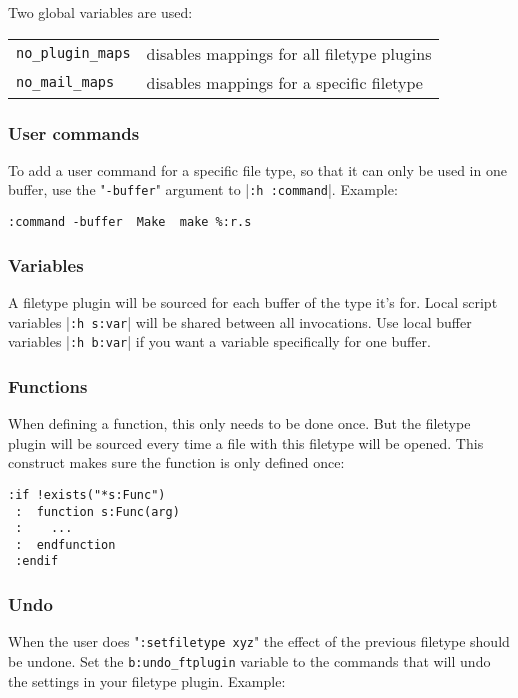 Two global variables are used:
\begin{center} \begin{tabular}{l l}
				\verb!no_plugin_maps! & disables mappings for all filetype plugins \\
				\verb!no_mail_maps! & disables mappings for a specific filetype \\
\end{tabular} \end{center}

\subsubsection{User commands}
To add a user command for a specific file type, so that it can only be used in one buffer, use the "\verb!-buffer!" argument to |\verb!:h :command!|.
Example:

\begin{Verbatim}[samepage=true]
 :command -buffer  Make  make %:r.s
\end{Verbatim}

\subsubsection{Variables}
A filetype plugin will be sourced for each buffer of the type it's for.
Local script variables |\verb!:h s:var!| will be shared between all invocations.
Use local buffer variables |\verb!:h b:var!| if you want a variable specifically for one buffer.

\subsubsection{Functions}
When defining a function, this only needs to be done once.
But the filetype plugin will be sourced every time a file with this filetype will be opened.
This construct makes sure the function is only defined once:

\begin{Verbatim}[samepage=true]
 :if !exists("*s:Func")
 :  function s:Func(arg)
 :    ...
 :  endfunction
 :endif
\end{Verbatim}

\subsubsection{Undo}
\label{undo_ftplugin}

When the user does "\verb!:setfiletype xyz!" the effect of the previous filetype should be undone.
Set the \verb!b:undo_ftplugin! variable to the commands that will undo the settings in your filetype plugin.
Example:

